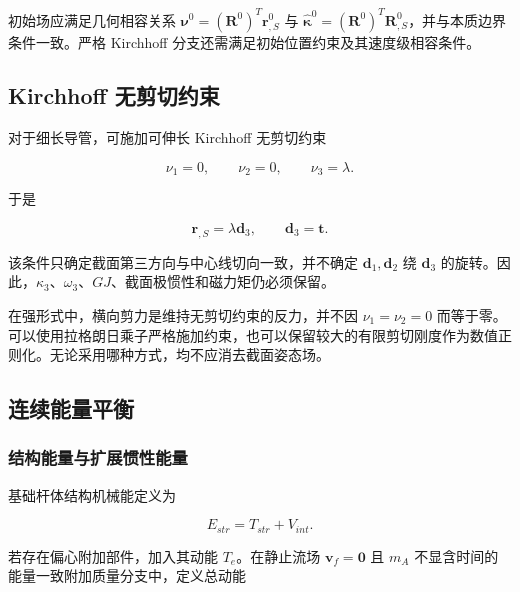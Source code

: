 初始场应满足几何相容关系 \(\bm{\nu}^{0} = \left( \mathbf{R}^{0} \right)^{T}\mathbf{r}_{,S}^{0}\) 与 \({\widehat{\bm{\kappa}}}^{0} = \left( \mathbf{R}^{0} \right)^{T}\mathbf{R}_{,S}^{0}\)，并与本质边界条件一致。严格 Kirchhoff 分支还需满足初始位置约束及其速度级相容条件。

\subsection{Kirchhoff 无剪切约束}\label{sec:rod-1-6}

对于细长导管，可施加可伸长 Kirchhoff 无剪切约束

\begin{equation}
\label{eq:rod-1-97}
\nu_{1} = 0,\quad\quad\nu_{2} = 0,\quad\quad\nu_{3} = \lambda.
\end{equation}

于是

\begin{equation}
\label{eq:rod-1-98}
\mathbf{r}_{,S} = \lambda\mathbf{d}_{3},\quad\quad\mathbf{d}_{3} = \mathbf{t}.
\end{equation}

该条件只确定截面第三方向与中心线切向一致，并不确定 \(\mathbf{d}_{1},\mathbf{d}_{2}\) 绕 \(\mathbf{d}_{3}\) 的旋转。因此，\(\kappa_{3}\)、\(\omega_{3}\)、\(GJ\)、截面极惯性和磁力矩仍必须保留。

在强形式中，横向剪力是维持无剪切约束的反力，并不因 \(\nu_{1} = \nu_{2} = 0\) 而等于零。可以使用拉格朗日乘子严格施加约束，也可以保留较大的有限剪切刚度作为数值正则化。无论采用哪种方式，均不应消去截面姿态场。\cite{MarsdenRatiu1999MechanicsSymmetry,HairerLubichWanner2006GNI}

\subsection{连续能量平衡}\label{sec:rod-1-7}

\subsubsection{结构能量与扩展惯性能量}\label{sec:rod-1-7-1}

基础杆体结构机械能定义为

\begin{equation}
\label{eq:rod-1-99}
E_{str} = T_{str} + V_{int}.
\end{equation}

若存在偏心附加部件，加入其动能 \(T_{e}\)。在静止流场 \(\mathbf{v}_{f} = \mathbf{0}\) 且 \(m_{A}\) 不显含时间的能量一致附加质量分支中，定义总动能

